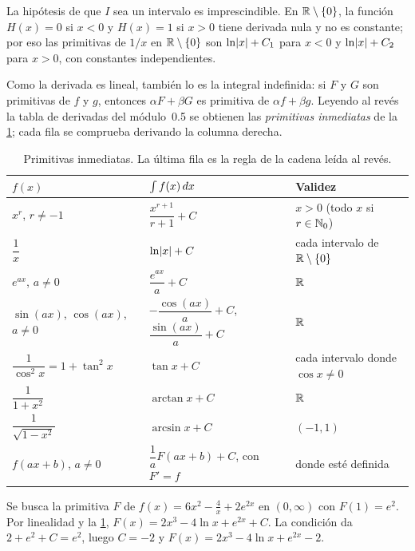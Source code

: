 La hipótesis de que $I$ sea un intervalo es imprescindible. En $\mathbb{R}\setminus\{0\}$, la función $H(x)=0$ si $x<0$ y $H(x)=1$ si $x>0$ tiene derivada nula y no es constante; por eso las primitivas de $1/x$ en $\mathbb{R}\setminus\{0\}$ son $\ln\lvert x\rvert+C_1$ para $x<0$ y $\ln\lvert x\rvert+C_2$ para $x>0$, con constantes independientes.

Como la derivada es lineal, también lo es la integral indefinida: si $F$ y $G$ son primitivas de $f$ y $g$, entonces $\alpha F+\beta G$ es primitiva de $\alpha f+\beta g$. Leyendo al revés la tabla de derivadas del módulo~0.5 se obtienen las \emph{primitivas inmediatas} de la \cref{tab:inmediatas}; cada fila se comprueba derivando la columna derecha.

\begin{table}[h]
\centering
\small
\begin{tabular}{@{}lll@{}}
\toprule
$f(x)$ & $\int f(x)\mathop{}\!d x$ & Validez \\
\midrule
$x^{r}$, $r\neq-1$ & $\dfrac{x^{r+1}}{r+1}+C$ & $x>0$ (todo $x$ si $r\in\mathbb{N}_0$) \\[4pt]
$\dfrac1x$ & $\ln\lvert x\rvert+C$ & cada intervalo de $\mathbb{R}\setminus\{0\}$ \\[4pt]
$e^{ax}$, $a\neq0$ & $\dfrac{e^{ax}}{a}+C$ & $\mathbb{R}$ \\[4pt]
$\sin(ax)$, $\cos(ax)$, $a\neq0$ & $-\dfrac{\cos(ax)}{a}+C$, \ $\dfrac{\sin(ax)}{a}+C$ & $\mathbb{R}$ \\[4pt]
$\dfrac{1}{\cos^{2}x}=1+\tan^{2}x$ & $\tan x+C$ & cada intervalo donde $\cos x\neq0$ \\[4pt]
$\dfrac{1}{1+x^{2}}$ & $\arctan x+C$ & $\mathbb{R}$ \\[4pt]
$\dfrac{1}{\sqrt{1-x^{2}}}$ & $\arcsin x+C$ & $(-1,1)$ \\[4pt]
$f(ax+b)$, $a\neq0$ & $\dfrac{1}{a}F(ax+b)+C$, con $F'=f$ & donde esté definida \\
\bottomrule
\end{tabular}
\caption{Primitivas inmediatas. La última fila es la regla de la cadena leída al revés.}
\label{tab:inmediatas}
\end{table}

\begin{ejemplo}\label{ej:primitiva-condicion}
Se busca la primitiva $F$ de $f(x)=6x^{2}-\frac{4}{x}+2e^{2x}$ en $(0,\infty)$ con $F(1)=e^{2}$. Por linealidad y la \cref{tab:inmediatas}, $F(x)=2x^{3}-4\ln x+e^{2x}+C$. La condición da $2+e^{2}+C=e^{2}$, luego $C=-2$ y $F(x)=2x^{3}-4\ln x+e^{2x}-2$.
\end{ejemplo}

